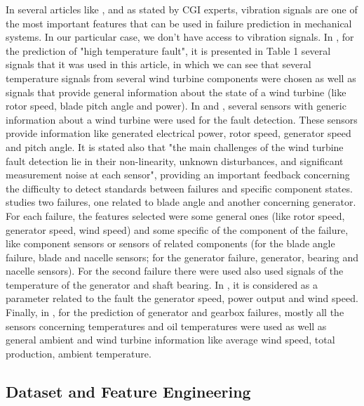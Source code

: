 In several articles like \cite{N_1_WIND} \cite{N_5_WIND}, and as stated by CGI experts, vibration signals are one of the most important features that can be used in failure prediction in mechanical systems. In our particular case, we don't have access to vibration signals.
In \cite{OLD_19_WIND}, for the prediction of "high temperature fault", it is presented in Table 1 several signals that it was used in this article, in which we can see that several temperature signals from several wind turbine components were chosen as well as signals that provide general information about the state of a wind turbine (like rotor speed, blade pitch angle and power).
In \cite{N_2_WIND} and \cite{39_WIND}, several sensors with generic information about a wind turbine were used for the fault detection. These sensors provide information like generated electrical power, rotor speed, generator speed and pitch angle. It is stated also that "the main challenges of the wind turbine fault detection lie in their non-linearity, unknown disturbances, and significant measurement noise at each sensor", providing an important feedback concerning the difficulty to detect standards between failures and specific component states.
\cite{N_3_WIND} studies two failures, one related to blade angle and another concerning generator. For each failure, the features selected were some general ones (like rotor speed, generator speed, wind speed) and some specific of the component of the failure, like component sensors or sensors of related components (for the blade angle failure, blade and nacelle sensors; for the generator failure, generator, bearing and nacelle sensors). For the second failure there were used also used signals of the temperature of the generator and shaft bearing.
In \cite{OLD_41_WIND}, it is considered as a parameter related to the fault the generator speed, power output and wind speed.
Finally, in \cite{N_8_WIND}, for the prediction of generator and gearbox failures, mostly all the sensors concerning temperatures and oil temperatures were used as well as general ambient and wind turbine information like average wind speed, total production, ambient temperature.


\subsection{Dataset and Feature Engineering}

